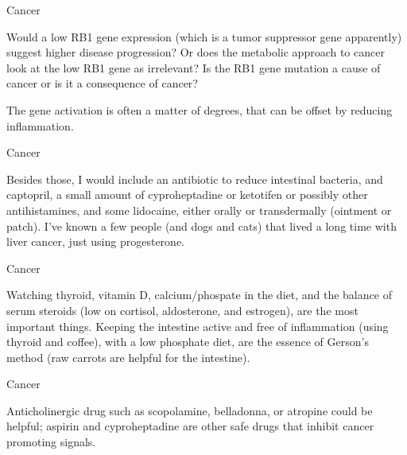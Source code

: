 \documentclass[11pt,oneside,openany,extrafontsizes]{memoir}
\begin{document}
\begin{qaexchange}{Cancer}

    \begin{question}
        Would a low RB1 gene expression (which is a tumor suppressor gene apparently)
suggest higher disease progression? Or does the metabolic approach to cancer look at the low RB1 gene as irrelevant? Is the RB1 gene mutation a cause of cancer or is it a consequence of cancer?
    \end{question}

    \begin{answer}
        The gene activation is often a matter of degrees, that can be offset by reducing inflammation.
    \end{answer}
\end{qaexchange}

\begin{standalonequote}{Cancer}

    \begin{answer}
        Besides those, I would include an antibiotic to reduce intestinal bacteria, and captopril, a small amount of cyproheptadine or ketotifen or possibly other antihistamines, and some lidocaine, either orally or transdermally (ointment or patch). I've known a few people (and dogs and cats) that lived a long time with liver cancer, just using progesterone.
    \end{answer}
\end{standalonequote}

\begin{standalonequote}{Cancer}

    \begin{answer}
        Watching thyroid, vitamin D, calcium/phospate in the diet, and the balance of serum steroids (low on cortisol, aldosterone, and estrogen), are the most important things. Keeping the intestine active and free of inflammation (using thyroid and coffee), with a low phosphate diet, are the essence of Gerson's method (raw carrots are helpful for the intestine).
    \end{answer}
\end{standalonequote}

\begin{standalonequote}{Cancer}

    \begin{answer}
        Anticholinergic drug such as scopolamine, belladonna, or atropine could be helpful; aspirin and cyproheptadine are other safe drugs that inhibit cancer promoting signals.
    \end{answer}
\end{standalonequote}
\end{document}
